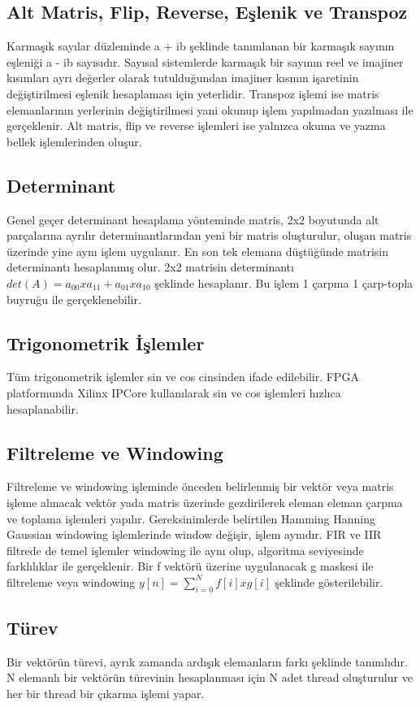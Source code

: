 \subsection{Alt Matris, Flip, Reverse, Eşlenik ve Transpoz}
Karmaşık sayılar düzleminde a + ib şeklinde tanımlanan bir karmaşık sayının eşleniği a - ib sayısıdır. Sayısal sistemlerde karmaşık bir sayının reel ve imajiner kısımları ayrı değerler olarak tutulduğundan imajiner kısmın işaretinin değiştirilmesi eşlenik hesaplaması için yeterlidir. Transpoz işlemi ise matris elemanlarının yerlerinin değiştirilmesi yani okunup işlem yapılmadan yazılması ile gerçeklenir. Alt matris, flip ve reverse işlemleri ise yalnızca okuma ve yazma bellek işlemlerinden oluşur. 

\subsection{Determinant}
Genel geçer determinant hesaplama yönteminde matris, 2x2 boyutunda alt parçalarına ayrılır determinantlarından yeni bir matris oluşturulur, oluşan matris üzerinde yine aynı işlem uygulanır. En son tek elemana düştüğünde matrisin determinantı hesaplanmış olur. 2x2 matrisin determinantı $det(A) = a_{00} x a_{11} + a_{01} x a_{10}$ şeklinde hesaplanır. Bu işlem 1 çarpma 1 çarp-topla buyruğu ile gerçeklenebilir.

\subsection{Trigonometrik İşlemler}
Tüm trigonometrik işlemler sin ve cos cinsinden ifade edilebilir. FPGA platformunda Xilinx IPCore kullanılarak sin ve cos işlemleri hızlıca hesaplanabilir. 

\subsection{Filtreleme ve Windowing}
Filtreleme ve windowing işleminde önceden belirlenmiş bir vektör veya matris işleme alınacak vektör yada matris üzerinde gezdirilerek eleman eleman çarpma ve toplama işlemleri yapılır. Gereksinimlerde belirtilen Hamming Hanning Gaussian windowing işlemlerinde window değişir, işlem aynıdır. FIR ve IIR filtrede de temel işlemler windowing ile aynı olup, algoritma seviyesinde farklılıklar ile gerçeklenir. Bir f vektörü üzerine uygulanacak g maskesi ile filtreleme veya windowing $y[n] = \sum_{i=0}^{N}f[i]xg[i]$ şeklinde gösterilebilir. 

\subsection{Türev}
Bir vektörün türevi, ayrık zamanda ardışık elemanların farkı şeklinde tanımlıdır. N elemanlı bir vektörün türevinin hesaplanması için N adet thread oluşturulur ve her bir thread bir çıkarma işlemi yapar. 

